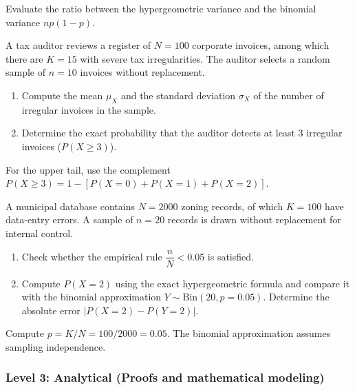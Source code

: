 \begin{sugerencia}
	Evaluate the ratio between the hypergeometric variance and the binomial variance $np(1-p)$.
\end{sugerencia}

\begin{problema}
	\label{prob:3.6.5}
	A tax auditor reviews a register of $N=100$ corporate invoices, among which there are $K=15$ with severe tax irregularities. The auditor selects a random sample of $n=10$ invoices without replacement.
	\begin{enumerate}
		\item Compute the mean $\mu_X$ and the standard deviation $\sigma_X$ of the number of irregular invoices in the sample.
		\item Determine the exact probability that the auditor detects at least $3$ irregular invoices ($P(X \ge 3)$).
	\end{enumerate}
\end{problema}

\begin{sugerencia}
	For the upper tail, use the complement $P(X \ge 3) = 1 - [P(X=0) + P(X=1) + P(X=2)]$.
\end{sugerencia}

\begin{problema}
	\label{prob:3.6.6}
	A municipal database contains $N=2000$ zoning records, of which $K=100$ have data-entry errors. A sample of $n=20$ records is drawn without replacement for internal control.
	\begin{enumerate}
		\item Check whether the empirical rule $\dfrac{n}{N} < 0.05$ is satisfied.
		\item Compute $P(X = 2)$ using the exact hypergeometric formula and compare it with the binomial approximation $Y \sim \text{Bin}(20, p=0.05)$. Determine the absolute error $|P(X=2) - P(Y=2)|$.
	\end{enumerate}
\end{problema}

\begin{sugerencia}
	Compute $p = K/N = 100/2000 = 0.05$. The binomial approximation assumes sampling independence.
\end{sugerencia}

\subsubsection*{Level 3: Analytical (Proofs and mathematical modeling)}

